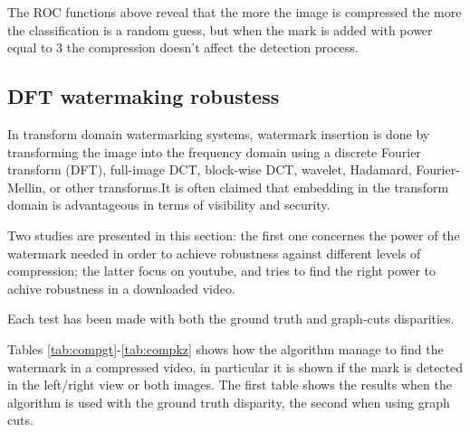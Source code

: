 The ROC functions above reveal that the more the image is compressed the more the classification is a random guess, but when the mark is added with power equal to 3 the compression doesn't affect the detection process.

\subsection{DFT watermaking robustess}

In transform domain watermarking systems, watermark insertion is done by transforming the image into the frequency domain using a discrete Fourier transform (DFT), full-image DCT, block-wise DCT, wavelet, Hadamard, Fourier-Mellin, or other transforms.\newline  It is often claimed that embedding in the transform domain is advantageous in terms of visibility and security.
 
Two studies are presented in this section: the first one concernes the power of the watermark needed in order to achieve robustness against different levels of compression; the latter focus on youtube, and tries to find the right power to achive robustness in a downloaded video.
 
Each test has been made with both the ground truth and graph-cuts disparities.
 
Tables \ref{tab:compgt}-\ref{tab:compkz} shows how the algorithm manage to find the watermark in a compressed video, in particular it is shown if the mark is detected in the left/right view or both images. The first table shows the results when the algorithm is used with the ground truth disparity, the second when using graph cuts.
\clearpage

\begin{table}[htbp]

 \begin{center}
 \caption{ detection table when ground truth disparity is used  \label{tab:compgt}}
 \end{center}
 \end{table}

